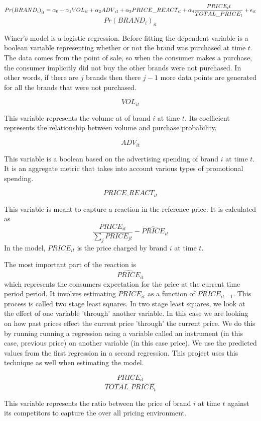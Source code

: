 \documentclass{article}
\begin{document}
$ {Pr(BRAND_i)}_{it} = \alpha_0 + \alpha_1 {VOL}_{it} + \alpha_2 {ADV}_{it} +  \alpha_3 PRICE\_REACT_{it}  \medskip + \alpha_4 \dfrac{PRICE_it}{TOTAL\_PRICE_{t}} + \epsilon_{it}$\\

$${Pr(BRAND_i)}_{it} $$

Winer's model is a logistic regression. Before fitting the dependent variable is a boolean variable representing whether or not the brand was purchased at time $t$. The data comes from the point of sale, so when the consumer makes a purchase, the consumer implicitly did not buy the other brands were not purchased. In other words, if there are $j$ brands then there $j-1$ more data points are generated for all the brands that were not purchased. 

$$VOL_{it}$$ 

This variable represents the volume at of brand $i$ at time $t$. Its coefficient represents the relationship between volume and purchase probability.

$$ADV_{it}$$ 

This variable is a boolean based on the advertising spending of brand $i$ at time $t$. It is an aggregate metric that takes into account various types of promotional spending.

$$PRICE\_REACT_{it}$$ 

This variable is meant to capture a reaction in the reference price. It is calculated as $$\dfrac{PRICE_{it}} {\sum_j PRICE_{jt}} - \widehat{PRICE}_{it}$$ In the model, ${PRICE}_{it}$ is the price charged by brand $i$ at time $t$. 

The most important part of the reaction is $$\widehat{PRICE}_{it}$$ which represents the consumers expectation for the price at the current time period period. It involves estimating ${PRICE}_{it}$ as a function of ${PRICE}_{it-1}$. This process is called two stage least squares. In two stage least squares, we look at the effect of one variable 'through' another variable.  In this case we are looking on how past prices effect the current price 'through' the current price. We do this by running running a regression using a variable called an instrument (in this case, previous price) on another variable (in this case price). We use the predicted values from the first regression in a second regression. This project uses this technique as well when estimating the model.

$$ \dfrac{PRICE_{it}}{TOTAL\_PRICE_{t}}$$ 

This variable represents the ratio between the price of brand $i$ at time $t$ against its competitors to capture the over all pricing environment.
\end{document}
